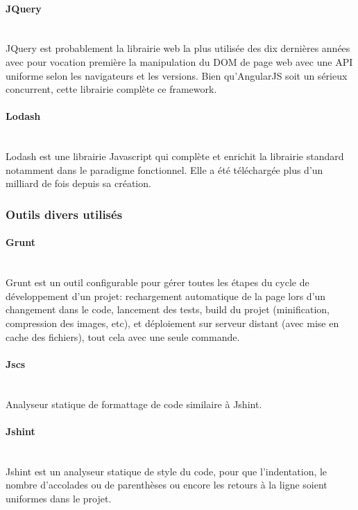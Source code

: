 \documentclass[a4paper,french,12pt]{article}
\begin{document}
		\paragraph{JQuery}~\\	
		JQuery est probablement la librairie web la plus utilisée des dix dernières années avec pour vocation première la manipulation du DOM de page web avec une API uniforme selon les navigateurs et les versions. Bien qu'AngularJS soit un sérieux concurrent, cette librairie complète ce framework.
		  	
		  \paragraph{Lodash}~\\	
		  Lodash est une librairie Javascript qui complète et enrichit la librairie standard notamment dans le paradigme fonctionnel.
		  Elle a été téléchargée plus d'un milliard de fois depuis sa création.
		  

		\subsubsection{Outils divers utilisés}
		  \paragraph{Grunt}~\\	
		  Grunt est un outil configurable pour gérer toutes les étapes du cycle de développement d'un projet: rechargement automatique de la page lors d'un changement dans le code, lancement des tests, build du projet (minification, compression des images, etc), et déploiement sur serveur distant (avec mise en cache des fichiers), tout cela avec une seule commande.

		\paragraph{Jscs}~\\	
		Analyseur statique de formattage de code similaire à Jshint.	  
		  
		 \paragraph{Jshint}~\\	
		 Jshint est un analyseur statique de style du code, pour que l'indentation, le nombre d'accolades ou de parenthèses ou encore les retours à la ligne soient uniformes dans le projet.
		 
\end{document}

